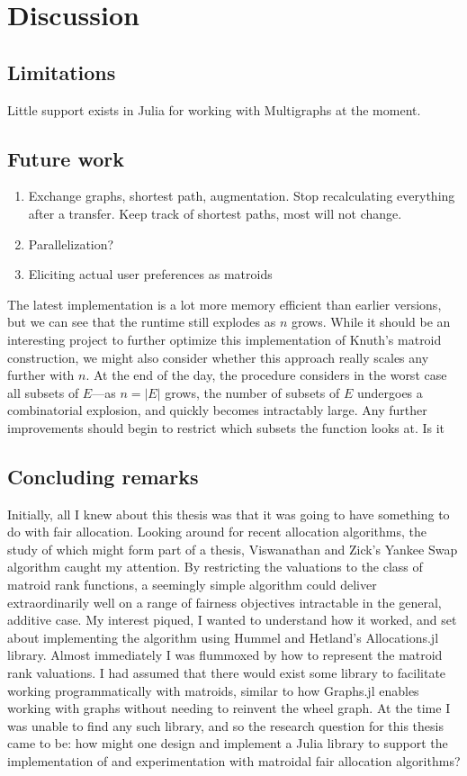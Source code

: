 \chapter{Discussion}
\label{chap:conclusions}
\skelpar

\section{Limitations}
Little support exists in Julia for working with Multigraphs at the moment.

\section{Future work}
\begin{enumerate}
  \item Exchange graphs, shortest path, augmentation. Stop recalculating everything after a transfer. Keep track of shortest paths, most will not change.
  \item Parallelization?
  \item Eliciting actual user preferences as matroids
\end{enumerate}

The latest implementation is a lot more memory efficient than earlier versions, but we can see that the runtime still explodes as $n$ grows. While it should be an interesting project to further optimize this implementation of Knuth's matroid construction, we might also consider whether this approach really scales any further with $n$. At the end of the day, the procedure considers in the worst case all subsets of $E$---as $n=|E|$ grows, the number of subsets of $E$ undergoes a combinatorial explosion, and quickly becomes intractably large. Any further improvements should begin to restrict which subsets the function looks at. Is it 

\section{Concluding remarks}
Initially, all I knew about this thesis was that it was going to have something to do with fair allocation. Looking around for recent allocation algorithms, the study of which might form part of a thesis, Viswanathan and Zick's Yankee Swap algorithm caught my attention. By restricting the valuations to the class of matroid rank functions, a seemingly simple algorithm could deliver extraordinarily well on a range of fairness objectives intractable in the general, additive case. My interest piqued, I wanted to understand how it worked, and set about implementing the algorithm using Hummel and Hetland's Allocations.jl library. Almost immediately I was flummoxed by how to represent the matroid rank valuations. I had assumed that there would exist some library to facilitate working programmatically with matroids, similar to how Graphs.jl enables working with graphs without needing to reinvent the wheel graph. At the time I was unable to find any such library, and so the research question for this thesis came to be: how might one design and implement a Julia library to support the implementation of and experimentation with matroidal fair allocation algorithms? 

